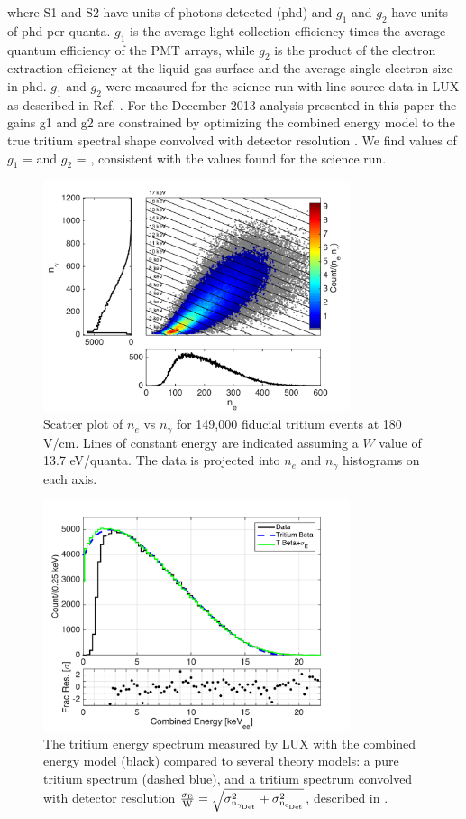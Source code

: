 \noindent
where S1 and S2 have units of photons detected (phd) and $g_1$ and $g_2$ have units of phd per quanta. $g_1$ is the average light collection efficiency times the average quantum efficiency of the PMT arrays, while $g_2$ is the product of the electron extraction efficiency at the liquid-gas surface and the average single electron size in phd. $g_1$ and $g_2$ were measured for the science run with line source data in LUX as described in Ref. \cite{lux-reanalysis, lux-prd}. For the December 2013 analysis presented in this paper the gains g1 and g2 are constrained by optimizing the combined energy model to the true tritium spectral shape \cite{Tritium_Eq_Simpson} convolved with detector resolution \cite{Dobi_Thesis}. We find values of $g_1$ = \gone and  $g_2$ = \gtwo, consistent with the values found for the science run.

\begin{figure}[h!]\centering
\includegraphics[width=90mm]{fig/tritium_scatter.png}
\caption{Scatter plot of $n_e$ vs $n_{\gamma}$ for 149,000 fiducial tritium events at 180 V/cm. Lines of constant energy are indicated assuming a $W$ value of 13.7 eV/quanta. The data is projected into $n_e$ and $n_{\gamma}$ histograms on each axis.}
\label{fig:tritium-scatter}
\end{figure}


\begin{figure}[h!]
\begin{center}
\includegraphics[width=90mm]{fig/tritium-spectrum-linear.png}
\caption{The tritium energy spectrum measured by LUX with the combined energy model (black) compared to several theory models: a pure tritium spectrum (dashed blue), and a tritium spectrum convolved with detector resolution  $\rm \frac{\sigma_E}{W} = \sqrt{\sigma_{n_{\gamma_{Det}}}^2 + \sigma_{n_{e_{Det}}}^2}$, described in \cite{Dobi_Thesis}. }
\label{fig:tritium-spectrum}
\end{center}
\end{figure}

